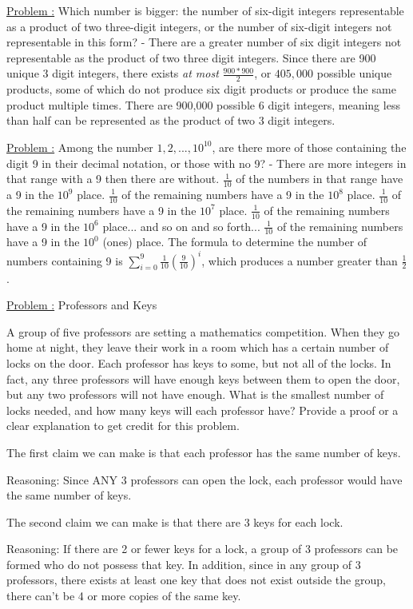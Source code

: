 \documentclass{article}
\def\pp{\par\noindent}
\newcounter{problemnumber}
\newcommand{\prob}{\bigskip \pp \underline{Problem \theproblemnumber:} \stepcounter{problemnumber}}
\begin{document}
\prob Which number is bigger: the number of six-digit integers representable
as a product of two three-digit integers, or the number of six-digit integers not
representable in this form?
- There are a greater number of six digit integers not representable as the product of two three digit integers. Since there are 900 unique 3 digit integers, there exists \textit{at most} $\frac{900*900}{2}$, or $405,000$ possible unique products, some of which do not produce six digit products or produce the same product multiple times. There are 900,000 possible 6 digit integers, meaning less than half can be represented as the product of two 3 digit integers.

\prob Among the number $1,2,...,10^{10}$, are there more of those containing the digit 9 in their decimal notation, or those with no 9? 
- There are more integers in that range with a 9 then there are without. $\frac{1}{10}$ of the numbers in that range have a 9 in the $10^{9}$ place. $\frac{1}{10}$ of the remaining numbers have a 9 in the $10^8$ place. $\frac{1}{10}$ of the remaining numbers have a 9 in the $10^7$ place. $\frac{1}{10}$ of the remaining numbers have a 9 in the $10^6$ place... and so on and so forth... $\frac{1}{10}$ of the remaining numbers have a 9 in the $10^0$ (ones) place. The formula to determine the number of numbers containing 9 is $\sum_{i=0}^{9} \frac{1}{10}(\frac{9}{10})^i$, which produces a number greater than $\frac{1}{2}$.

\prob  Professors and Keys

\pp A group of five professors are setting a mathematics
competition. When they go home at night, they leave their work in a
room which has a certain number of locks on the door. Each professor
has keys to some, but not all of the locks. In fact, any three
professors will have enough keys between them to open the door, but
any two professors will not have enough. What is the smallest number
of locks needed, and how many keys will each professor have? Provide
a proof or a clear explanation to get credit for this problem.

The first claim we can make is that each professor has the same number of keys.

Reasoning: Since ANY 3 professors can open the lock, each professor would have the same number of keys.

The second claim we can make is that there are 3 keys for each lock.

Reasoning: If there are 2 or fewer keys for a lock, a group of 3 professors can be formed who do not possess that key. In addition, since in any group of 3 professors, there exists at least one key that does not exist outside the group, there can't be 4 or more copies of the same key.
\end{document}
